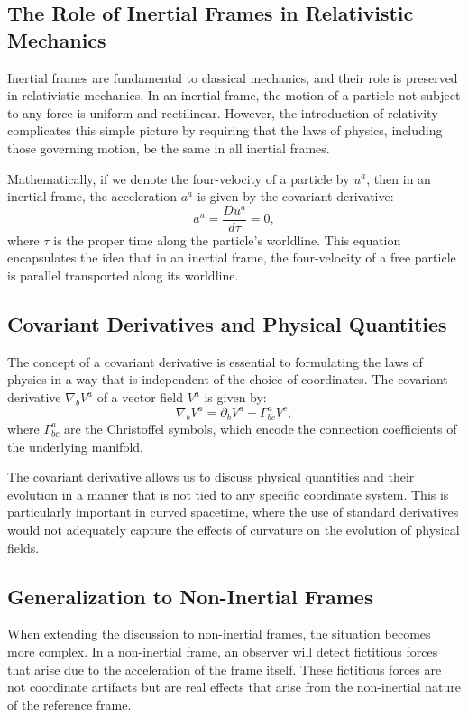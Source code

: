\documentclass[12pt]{article}
\begin{document}
\subsection{The Role of Inertial Frames in Relativistic Mechanics}
Inertial frames are fundamental to classical mechanics, and their role is preserved in relativistic mechanics. In an inertial frame, the motion of a particle not subject to any force is uniform and rectilinear. However, the introduction of relativity complicates this simple picture by requiring that the laws of physics, including those governing motion, be the same in all inertial frames.

Mathematically, if we denote the four-velocity of a particle by \( u^a \), then in an inertial frame, the acceleration \( a^a \) is given by the covariant derivative:
\begin{equation}
a^a = \frac{D u^a}{d\tau} = 0,
\end{equation}
where \( \tau \) is the proper time along the particle's worldline. This equation encapsulates the idea that in an inertial frame, the four-velocity of a free particle is parallel transported along its worldline.

\subsection{Covariant Derivatives and Physical Quantities}
The concept of a covariant derivative is essential to formulating the laws of physics in a way that is independent of the choice of coordinates. The covariant derivative \( \nabla_b V^a \) of a vector field \( V^a \) is given by:
\begin{equation}
\nabla_b V^a = \partial_b V^a + \Gamma^a_{bc} V^c,
\end{equation}
where \( \Gamma^a_{bc} \) are the Christoffel symbols, which encode the connection coefficients of the underlying manifold.

The covariant derivative allows us to discuss physical quantities and their evolution in a manner that is not tied to any specific coordinate system. This is particularly important in curved spacetime, where the use of standard derivatives would not adequately capture the effects of curvature on the evolution of physical fields.

\subsection{Generalization to Non-Inertial Frames}
When extending the discussion to non-inertial frames, the situation becomes more complex. In a non-inertial frame, an observer will detect fictitious forces that arise due to the acceleration of the frame itself. These fictitious forces are not coordinate artifacts but are real effects that arise from the non-inertial nature of the reference frame.
\end{document}
